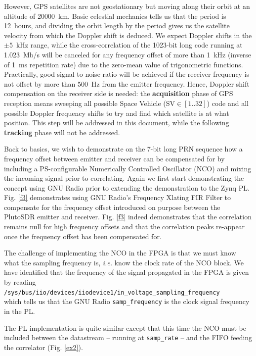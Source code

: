 \documentclass{article}
\begin{document}
However, GPS satellites are not geostationary but moving along their orbit at an altitude of 20000~km. Basic
celestial mechanics tells us that the period is 12~hours, and dividing the orbit length by the period gives
us the satellite velocity from which the Doppler shift is deduced. We expect Doppler shifts in the $\pm 5$~kHz 
range, while the cross-correlation of the 1023-bit long code running at 1.023~Mb/s will be canceled for
any frequency offset of more than 1~kHz (inverse of 1~ms repetition rate) due to the zero-mean value of trigonometric
functions. Practically, good signal to noise ratio will be achieved if the receiver frequency is not offset
by more than 500~Hz from the emitter frequency. Hence, Doppler shift compensation on the receiver side is needed:
the {\bf acquisition} phase of GPS reception means sweeping all possible Space Vehicle (SV$\in[1..32]$) code and 
all possible Doppler frequency shifts to try and find which satellite is at what position. This step will be 
addressed in this document, while the following {\bf tracking} phase will not be addressed.

Back to basics, we wish to demonstrate on the 7-bit long PRN sequence how a frequency offset between emitter
and receiver can be compensated for by including a PS-configurable Numerically Controlled Oscillator (NCO) and
mixing the incoming signal prior to correlating. Again we first start demonstrating the concept using GNU Radio
prior to extending the demonstration to the Zynq PL. Fig. \ref{f3} demonstrates using GNU Radio's Frequency 
Xlating FIR Filter to compensate for the frequency offset introduced on purpose between the PlutoSDR emitter and 
receiver. Fig. \ref{f3} indeed demonstrates that the correlation remains null for high frequency offsets and
that the correlation peaks re-appear once the frequency offset has been compensated for.

The challenge of implementing the NCO in the FPGA is that we must know what the sampling frequency is, {\em i.e.}
know the clock rate of the NCO block. We have identified that the frequency of the signal propagated in the 
FPGA is given by reading\\
{\tt /sys/bus/iio/devices/iio\:device1/in\_voltage\_sampling\_frequency}\\
which tells us that the GNU Radio {\tt samp\_frequency} is the clock signal frequency in the PL.

The PL implementation is quite similar except that this time the NCO must be included
between the datastream -- running at {\tt samp\_rate} -- and the FIFO feeding the correlator (Fig.
\ref{ex2}).
\end{document}
